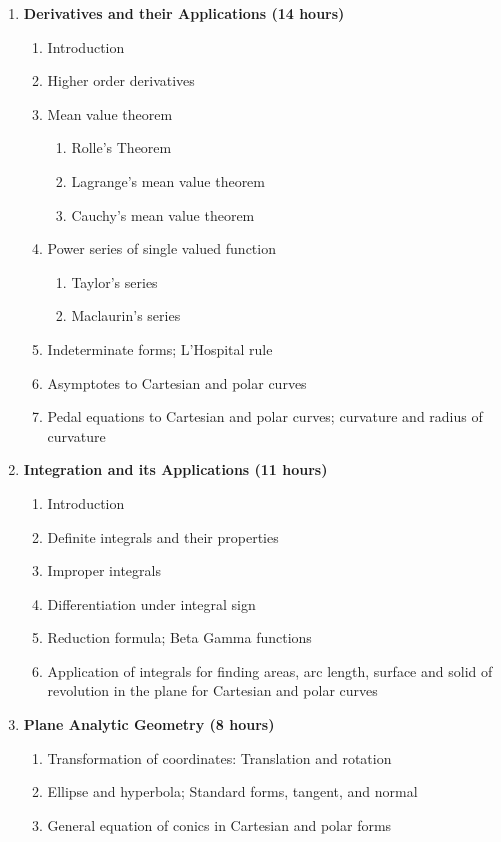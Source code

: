 \begin{enumerate}
    \item \textbf{Derivatives and their Applications \hfill (14 hours)}
    \begin{enumerate}
        \item Introduction
        \item Higher order derivatives
        \item Mean value theorem
        \begin{enumerate}
            \item Rolle's Theorem
            \item Lagrange's mean value theorem
            \item Cauchy's mean value theorem
        \end{enumerate}
        \item Power series of single valued function
        \begin{enumerate}
            \item Taylor's series
            \item Maclaurin's series
        \end{enumerate}
        \item Indeterminate forms; L'Hospital rule
        \item Asymptotes to Cartesian and polar curves
        \item Pedal equations to Cartesian and polar curves; curvature and radius of curvature
    \end{enumerate}
    
    \item \textbf{Integration and its Applications \hfill (11 hours) }
    \begin{enumerate}
        \item Introduction
        \item Definite integrals and their properties
        \item Improper integrals
        \item Differentiation under integral sign
        \item Reduction formula; Beta Gamma functions
        \item Application of integrals for finding areas, arc length, surface and solid of revolution in the plane for Cartesian and polar curves
    \end{enumerate}
    
    \item \textbf{Plane Analytic Geometry \hfill (8 hours)}
    \begin{enumerate}
        \item Transformation of coordinates: Translation and rotation
        \item Ellipse and hyperbola; Standard forms, tangent, and normal
        \item General equation of conics in Cartesian and polar forms
    \end{enumerate}
    

\end{enumerate}

